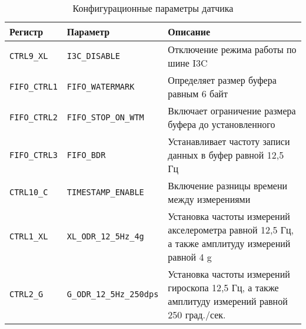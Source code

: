 \begin{table}[ht]
    \caption{Конфигурационные параметры датчика}
    \label{table:func:memsConf}
    \begin{tabular}{| >{\raggedright}m{}
                    | >{\raggedright}m{}
                    | >{\raggedright\arraybackslash}m{}|}
        \hline
        \centering Регистр & \centering Параметр & \centering\arraybackslash Описание \\
  
        \hline
        \lstinline[]$CTRL9_XL$ & 
        \lstinline[]$I3C_DISABLE$ & 
        Отключение режима работы по шине I3C
        \\  
        \hline
        \lstinline[]$FIFO_CTRL1$ & 
        \lstinline[]$FIFO_WATERMARK$& 
        Определяет размер буфера равным 6 байт
        \\  
        \hline
        \lstinline[]$FIFO_CTRL2$ & 
        \lstinline[]$FIFO_STOP_ON_WTM$ & 
        Включает ограничение размера буфера до установленного
        \\  
        \hline
        \lstinline[]$FIFO_CTRL3$ & 
        \lstinline[]$FIFO_BDR$ & 
        Устанавливает частоту записи данных в буфер равной 12,5 Гц
        \\  
        \hline
        \lstinline[]$CTRL10_C$ & 
        \lstinline[]$TIMESTAMP_ENABLE$ & 
        Включение разницы времени между измерениями
        \\
        \hline
        \lstinline[]$CTRL1_XL$ & 
        \lstinline[]$XL_ODR_12_5Hz_4g$ & 
        Установка частоты измерений акселерометра равной 12,5 Гц, а также амплитуду измерений равной 4 g
        \\
        \hline
        \lstinline[]$CTRL2_G$ & 
        \lstinline[]$G_ODR_12_5Hz_250dps$ & 
        Установка частоты измерений гироскопа 12,5 Гц, а также амплитуду измерений равной 250 град./сек.
        \\
        \hline
    \end{tabular}
  \end{table}

